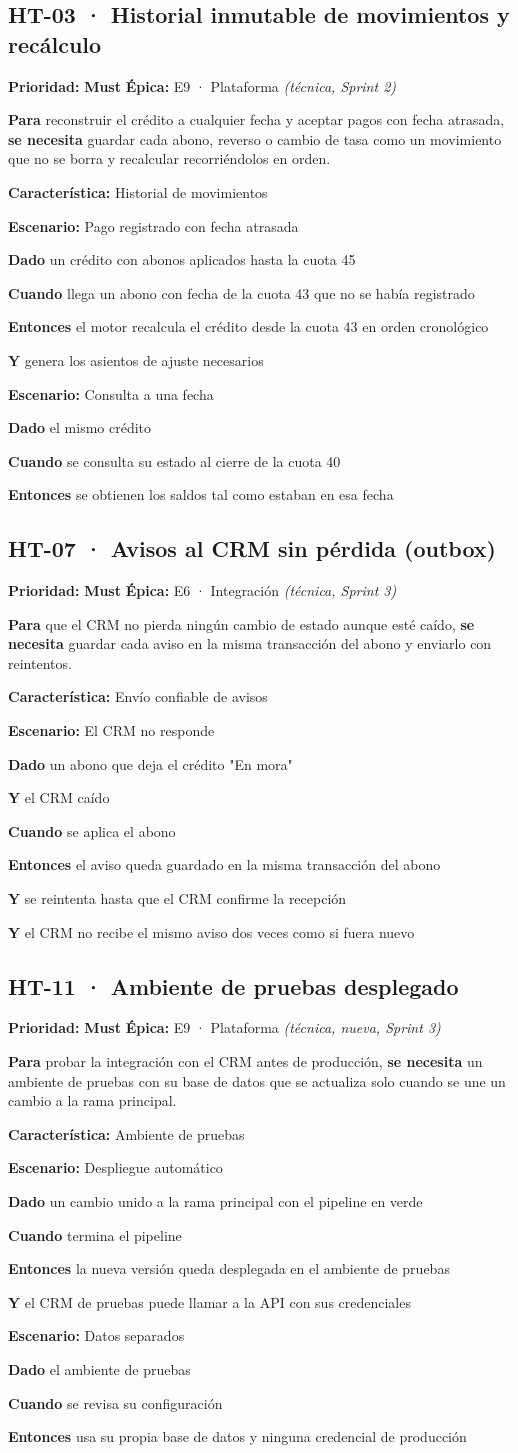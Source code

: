 \documentclass[11pt,a4paper]{article}
\newcommand{\kw}[1]{\textbf{\color{primario}#1}}
\newcommand{\nv}[1]{\par\hspace*{#1em}}
\newcommand{\hu}[5]{%
  \subsection*{#1 · #2}
  \noindent\textbf{Prioridad:} #3 \quad\textbf{Épica:} #4\par\smallskip
  \noindent #5\par\smallskip}
\newcommand{\paraht}[2]{\textbf{Para} #1, \textbf{se necesita} #2.}
\newcommand{\must}{\colorbox{alerta}{\color{white}\textbf{\small Must}}}
\begin{document}
\hu{HT-03}{Historial inmutable de movimientos y recálculo}{\must}{E9 · Plataforma \textit{(técnica, Sprint 2)}}{%
\paraht{reconstruir el crédito a cualquier fecha y aceptar pagos con fecha atrasada}{guardar cada abono, reverso o cambio de tasa como un movimiento que no se borra y recalcular recorriéndolos en orden}}
\begin{gherkin}
\kw{Característica:} Historial de movimientos
\nv{1}\kw{Escenario:} Pago registrado con fecha atrasada
\nv{2}\kw{Dado} un crédito con abonos aplicados hasta la cuota 45
\nv{2}\kw{Cuando} llega un abono con fecha de la cuota 43 que no se había registrado
\nv{2}\kw{Entonces} el motor recalcula el crédito desde la cuota 43 en orden cronológico
\nv{2}\kw{Y} genera los asientos de ajuste necesarios
\nv{1}\kw{Escenario:} Consulta a una fecha
\nv{2}\kw{Dado} el mismo crédito
\nv{2}\kw{Cuando} se consulta su estado al cierre de la cuota 40
\nv{2}\kw{Entonces} se obtienen los saldos tal como estaban en esa fecha
\end{gherkin}

\hu{HT-07}{Avisos al CRM sin pérdida (outbox)}{\must}{E6 · Integración \textit{(técnica, Sprint 3)}}{%
\paraht{que el CRM no pierda ningún cambio de estado aunque esté caído}{guardar cada aviso en la misma transacción del abono y enviarlo con reintentos}}
\begin{gherkin}
\kw{Característica:} Envío confiable de avisos
\nv{1}\kw{Escenario:} El CRM no responde
\nv{2}\kw{Dado} un abono que deja el crédito "En mora"
\nv{2}\kw{Y} el CRM caído
\nv{2}\kw{Cuando} se aplica el abono
\nv{2}\kw{Entonces} el aviso queda guardado en la misma transacción del abono
\nv{2}\kw{Y} se reintenta hasta que el CRM confirme la recepción
\nv{2}\kw{Y} el CRM no recibe el mismo aviso dos veces como si fuera nuevo
\end{gherkin}

\hu{HT-11}{Ambiente de pruebas desplegado}{\must}{E9 · Plataforma \textit{(técnica, nueva, Sprint 3)}}{%
\paraht{probar la integración con el CRM antes de producción}{un ambiente de pruebas con su base de datos que se actualiza solo cuando se une un cambio a la rama principal}}
\begin{gherkin}
\kw{Característica:} Ambiente de pruebas
\nv{1}\kw{Escenario:} Despliegue automático
\nv{2}\kw{Dado} un cambio unido a la rama principal con el pipeline en verde
\nv{2}\kw{Cuando} termina el pipeline
\nv{2}\kw{Entonces} la nueva versión queda desplegada en el ambiente de pruebas
\nv{2}\kw{Y} el CRM de pruebas puede llamar a la API con sus credenciales
\nv{1}\kw{Escenario:} Datos separados
\nv{2}\kw{Dado} el ambiente de pruebas
\nv{2}\kw{Cuando} se revisa su configuración
\nv{2}\kw{Entonces} usa su propia base de datos y ninguna credencial de producción
\end{gherkin}
\end{document}
